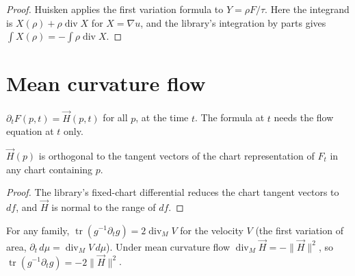\begin{proof}
  \leanok
  Huisken applies the first variation formula to $Y = \rho F/\tau$. Here the integrand is $X(\rho) + \rho \operatorname{div} X$ for $X = \nabla u$, and the library's integration by parts gives $\int X(\rho) = -\int \rho \operatorname{div} X$.
\end{proof}

\section{Mean curvature flow}

\begin{definition}
  \label{def:mcf}
  \leanok
  $\partial_t F(p, t) = \vec H(p, t)$ for all $p$, at the time $t$. The formula at $t$
  needs the flow equation at $t$ only.
\end{definition}

\begin{lemma}
  \label{lem:normal-every-chart}
  \leanok
  $\vec H(p)$ is orthogonal to the tangent vectors of the chart representation of $F_t$ in
  any chart containing $p$.
\end{lemma}

\begin{proof}
  \leanok
  The library's fixed-chart differential reduces the chart tangent vectors to $df$, and $\vec H$ is normal to the range of $df$.
\end{proof}

\begin{theorem}
  \label{thm:volume-evolution}
  \leanok
  For any family, $\operatorname{tr}(g^{-1}\partial_t g) = 2\operatorname{div}_M V$ for the
  velocity $V$ (the first variation of area, $\partial_t\,d\mu = \operatorname{div}_M V\,d\mu$).
  Under mean curvature flow $\operatorname{div}_M \vec H = -\|\vec H\|^2$, so
  $\operatorname{tr}(g^{-1}\partial_t g) = -2\|\vec H\|^2$.
\end{theorem}

